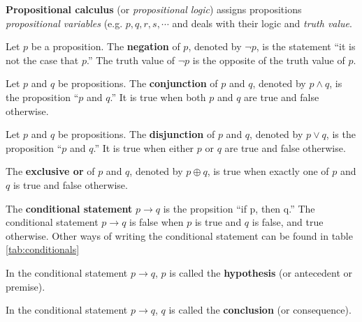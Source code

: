 \begin{defn}
  \textbf{Propositional calculus} (or \emph{propositional logic}) assigns propositions \emph{propositional variables}
  (e.g. \(p, q, r, s, \cdots\) and deals with their logic and \emph{truth value}.
\end{defn}
\begin{defn}
  Let \(p\) be a proposition. The \textbf{negation} of \(p\), denoted by \(\neg p\), is the statement
  ``it is not the case that \(p\).''
  The truth value of \(\neg p\) is the opposite of the truth value of \(p\).
\end{defn}
\begin{defn}
  Let \(p\) and \(q\) be propositions. The \textbf{conjunction} of \(p\) and \(q\), denoted by \( p \wedge q \), is the proposition
  ``\(p\) and \(q\).'' It is true when both \(p\) and \(q\) are true and false otherwise.
\end{defn}
\begin{defn}
  Let \(p\) and \(q\) be propositions. The \textbf{disjunction} of \(p\) and \(q\), denoted by \( p \vee q \), is the proposition
  ``\(p\) and \(q\).'' It is true when either \(p\) or \(q\) are true and false otherwise.
\end{defn}
\begin{defn}
  The \textbf{exclusive or} of \(p\) and \(q\), denoted by \(p \oplus q\), is true when exactly one of \(p\) and \(q\) is true and false otherwise.
\end{defn}
\begin{defn}
  The \textbf{conditional statement} \(p \to q\) is the propsition ``if p, then q.''
  The conditional statement \(p \to q\) is false when \(p\) is true and \(q\) is false, and true otherwise.
  Other ways of writing the conditional statement can be found in table \ref{tab:conditionals}
\end{defn}
\begin{defn} 
  In the conditional statement \(p \to q\), \(p\) is called the \textbf{hypothesis} (or antecedent or premise).
\end{defn}
\begin{defn} 
  In the conditional statement \(p \to q\), \(q\) is called the \textbf{conclusion} (or consequence).
\end{defn}
